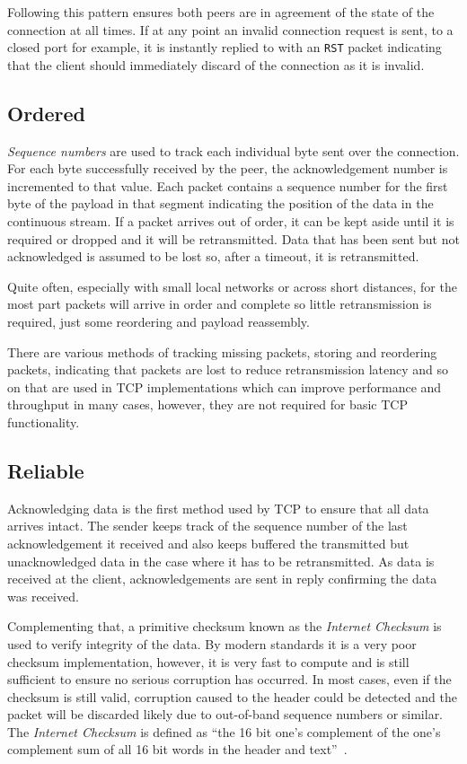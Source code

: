         Following this pattern ensures both peers are in agreement of the state of the connection at all times. If at any point an invalid connection request is sent, to a closed port for example, it is instantly replied to with an \texttt{RST} packet indicating that the client should immediately discard of the connection as it is invalid.

    \subsection{Ordered}
        \textit{Sequence numbers} are used to track each individual byte sent over the connection. For each byte successfully received by the peer, the acknowledgement number is incremented to that value. Each packet contains a sequence number for the first byte of the payload in that segment indicating the position of the data in the continuous stream. If a packet arrives out of order, it can be kept aside until it is required or dropped and it will be retransmitted. Data that has been sent but not acknowledged is assumed to be lost so, after a timeout, it is retransmitted.

        Quite often, especially with small local networks or across short distances, for the most part packets will arrive in order and complete so little retransmission is required, just some reordering and payload reassembly.

        There are various methods of tracking missing packets, storing and reordering packets, indicating that packets are lost to reduce retransmission latency and so on that are used in TCP implementations which can improve performance and throughput in many cases, however, they are not required for basic TCP functionality.

    \subsection{Reliable}\label{sec:reliable}
        Acknowledging data is the first method used by TCP to ensure that all data arrives intact. The sender keeps track of the sequence number of the last acknowledgement it received and also keeps buffered the transmitted but unacknowledged data in the case where it has to be retransmitted. As data is received at the client, acknowledgements are sent in reply confirming the data was received.

        Complementing that, a primitive checksum known as the \textit{Internet Checksum} is used to verify integrity of the data. By modern standards it is a very poor checksum implementation, however, it is very fast to compute and is still sufficient to ensure no serious corruption has occurred. In most cases, even if the checksum is still valid, corruption caused to the header could be detected and the packet will be discarded likely due to out-of-band sequence numbers or similar. The \textit{Internet Checksum} is defined as ``the 16 bit one's complement of the one's complement sum of all 16 bit words in the header and text''~\cite[3.1]{rfc793}.

